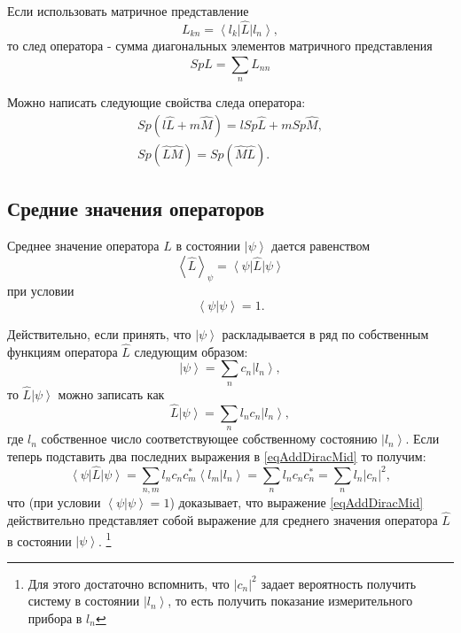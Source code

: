Если использовать матричное представление 
\[
L_{kn} = \left<l_k\right| \hat{L} \left|l_n\right>, 
\]
то след оператора - сумма диагональных элементов матричного 
представления
\[
Sp \hat{L} = \sum_n L_{nn}
\]

Можно написать следующие свойства следа оператора:
\begin{eqnarray}
Sp\left(l \hat{L} + m \hat{M}\right) = 
l Sp \hat{L} + m Sp \hat{M},
\nonumber \\
Sp\left(\hat{L}\hat{M}\right) = 
Sp\left(\hat{M}\hat{L}\right).
\label{eqAddDiracTrProperty}
\end{eqnarray}

\subsection{Средние  значения  операторов}
Среднее значение оператора $\hat{L}$   в состоянии $\left| \psi
\right>$  дается равенством 
\begin{equation}  
\left< \hat{L} \right>_{\psi} = \left<\psi\right|\hat{L}\left|\psi\right>
\label{eqAddDiracMid}
\end{equation}  
при условии
\[
\left<\psi\right.\left|\psi\right> = 1.
\]

Действительно, если принять, что $\left|\psi\right>$ раскладывается в
ряд по собственным функциям оператора $\hat{L}$ следующим образом:
\[
\left|\psi\right> = \sum_n c_n \left|l_n\right>,
\]
то $\hat{L}\left|\psi\right>$ можно записать как
\[
\hat{L}\left|\psi\right> = \sum_n l_n c_n \left|l_n\right>,
\]
где $l_n$ собственное число соответствующее собственному состоянию 
$\left|l_n\right>$. 
Если теперь подставить два последних выражения в \eqref{eqAddDiracMid}
то получим:
\[
\left<\psi\right|\hat{L}\left|\psi\right> = \sum_{n,m} 
l_n c_n c_m^{*} \left<l_m\right. \left|l_n\right>=
\sum_n l_n c_n c_n^{*} = 
\sum_n l_n \left|c_n\right|^2, 
\]
что (при условии $\left<\psi\right.\left|\psi\right> = 1$) доказывает,
что выражение \eqref{eqAddDiracMid} действительно 
представляет собой выражение для среднего значения оператора 
$\hat{L}$   в состоянии $\left|\psi\right>$.
\footnote{Для этого достаточно вспомнить, что $\left|c_n\right|^2$
  задает вероятность получить систему в состоянии $\left|l_n\right>$,
  то есть получить показание измерительного прибора в $l_n$}

